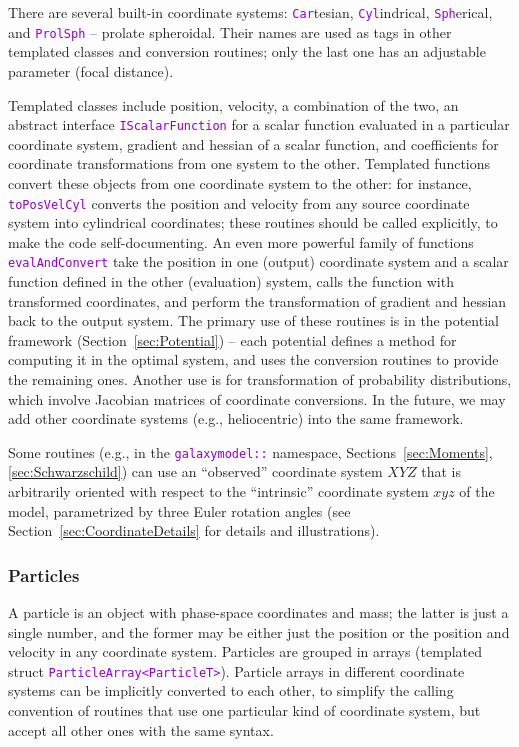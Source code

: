 \documentclass[12pt]{article}
\newcommand{\ttt}[1]{\textcolor{darkviolet}{\texttt{#1}}}
\begin{document}
There are several built-in coordinate systems: \ttt{Car}tesian, \ttt{Cyl}indrical, \ttt{Sph}erical, and \ttt{ProlSph} -- prolate spheroidal. Their names are used as tags in other templated classes and conversion routines; only the last one has an adjustable parameter (focal distance).

Templated classes include position, velocity, a combination of the two, an abstract interface \ttt{IScalarFunction} for a scalar function evaluated in a particular coordinate system, gradient and hessian of a scalar function, and coefficients for coordinate transformations from one system to the other. Templated functions convert these objects from one coordinate system to the other: for instance, \ttt{toPosVelCyl} converts the position and velocity from any source coordinate system into cylindrical coordinates; these routines should be called explicitly, to make the code self-documenting. An even more powerful family of functions \ttt{evalAndConvert} take the position in one (output) coordinate system and a scalar function defined in the other (evaluation) system, calls the function with transformed coordinates, and perform the transformation of gradient and hessian back to the output system. The primary use of these routines is in the potential framework (Section~\ref{sec:Potential}) -- each potential defines a method for computing it in the optimal system, and uses the conversion routines to provide the remaining ones. Another use is for transformation of probability distributions, which involve Jacobian matrices of coordinate conversions. In the future, we may add other coordinate systems (e.g., heliocentric) into the same framework.

Some routines (e.g., in the \ttt{galaxymodel::} namespace, Sections~\ref{sec:Moments}, \ref{sec:Schwarzschild}) can use an ``observed'' coordinate system $XYZ$ that is arbitrarily oriented with respect to the ``intrinsic'' coordinate system $xyz$ of the model, parametrized by three Euler rotation angles (see Section~\ref{sec:CoordinateDetails} for details and illustrations).

\subsubsection{Particles}  \label{sec:Particles}
A particle is an object with phase-space coordinates and mass; the latter is just a single number, and the former may be either just the position or the position and velocity in any coordinate system. Particles are grouped in arrays (templated struct \ttt{ParticleArray<ParticleT>}).
Particle arrays in different coordinate systems can be implicitly converted to each other, to simplify the calling convention of routines that use one particular kind of coordinate system, but accept all other ones with the same syntax.
\end{document}
